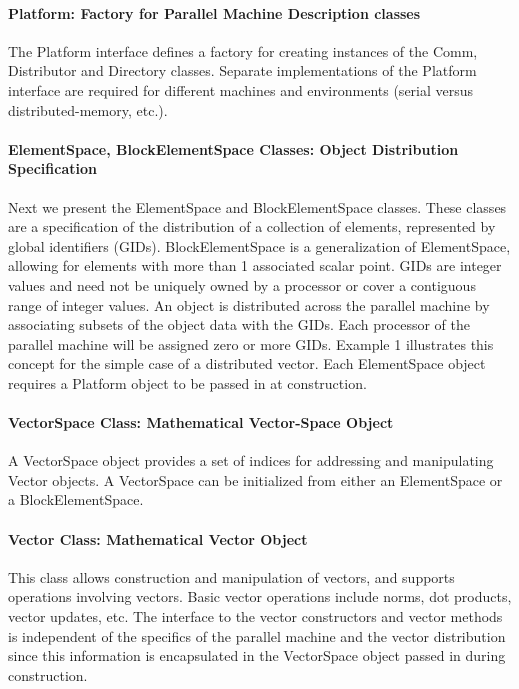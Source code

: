 \documentclass[12pt,relax]{PetraObjectModel}
\begin{document}
\paragraph{Platform: Factory for Parallel Machine Description classes}

The Platform interface defines a factory for creating instances of the Comm,
Distributor and Directory classes. Separate implementations of the Platform
interface are required for different machines and environments (serial versus
distributed-memory, etc.).

\paragraph{ElementSpace, BlockElementSpace Classes: Object Distribution Specification}

Next we present the ElementSpace and BlockElementSpace classes.  These classes
are a specification of the distribution of a collection of elements, represented
by global identifiers (GIDs). BlockElementSpace is a generalization of
ElementSpace, allowing for elements with more than 1 associated scalar point.
 GIDs are integer values and need not be uniquely owned by a 
processor or cover a contiguous range of integer values.  An object is 
distributed across the parallel machine by associating subsets of the 
object data with the GIDs.  Each processor of the parallel machine will be 
assigned zero or more GIDs.  Example 1 illustrates this concept for the 
simple case of a distributed vector.   Each ElementSpace object requires a
Platform object to be passed in at construction.

\paragraph{VectorSpace Class: Mathematical Vector-Space Object}

A VectorSpace object provides a set of indices for addressing and manipulating
Vector objects. A VectorSpace can be initialized from either an ElementSpace or
a BlockElementSpace.

\paragraph{Vector Class:  Mathematical Vector Object}

This class allows construction and manipulation of vectors, and supports 
operations involving vectors.  Basic vector 
operations include norms, dot products, vector updates, etc.  The interface 
to the vector constructors and vector methods is independent of the specifics 
of the parallel machine and the vector distribution since this information is 
encapsulated in the VectorSpace object passed in during construction.
\end{document}
